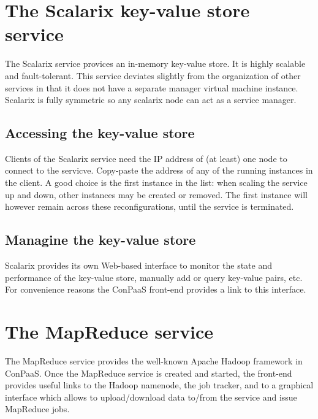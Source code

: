 \documentclass[10pt]{article}
\begin{document}
\section{The Scalarix key-value store service}

The Scalarix service provices an in-memory key-value store. It is
highly scalable and fault-tolerant. This service deviates slightly
from the organization of other services in that it does not have a
separate manager virtual machine instance. Scalarix is fully symmetric
so any scalarix node can act as a service manager.

\subsection{Accessing the key-value store}

Clients of the Scalarix service need the IP address of (at least) one
node to connect to the servicve. Copy-paste the address of any of the
running instances in the client. A good choice is the first instance
in the list: when scaling the service up and down, other instances may
be created or removed. The first instance will however remain across
these reconfigurations, until the service is terminated.



\subsection{Managine the key-value store}

Scalarix provides its own Web-based interface to monitor the state and
performance of the key-value store, manually add or query key-value
pairs, etc. For convenience reasons the ConPaaS front-end provides a
link to this interface.

\section{The MapReduce service}

The MapReduce service provides the well-known Apache Hadoop framework
in ConPaaS. Once the MapReduce service is created and started, the
front-end provides useful links to the Hadoop namenode, the job
tracker, and to a graphical interface which allows to upload/download
data to/from the service and issue MapReduce jobs.

\end{document}
